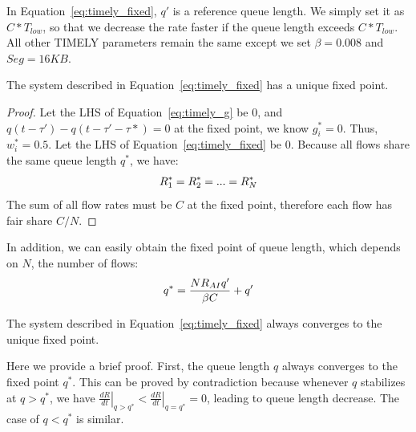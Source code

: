 In Equation~\ref{eq:timely_fixed}, $q'$ is a reference queue length. We simply set it as $C*T_{low}$, 
so that we decrease the rate faster if the queue length exceeds $C*T_{low}$. All
other TIMELY
parameters remain the same except we set $\beta=0.008$ and $Seg=16KB$. 
\begin{thm}
The system described in Equation~\ref{eq:timely_fixed} has a unique fixed point.
\end{thm}
\begin{proof}
Let the LHS of Equation~\ref{eq:timely_g} be 0, and $q(t - \tau ') - q(t - \tau ' - \tau *) = 0$ at the fixed 
point, we know $g_i^*=0$. Thus, $w_i^*=0.5$. Let the LHS of Equation~\ref{eq:timely_fixed} be 0. Because
all flows share the same queue length $q^*$, we have:
\begin{equation}
\small
R_1^* = R_2^* = ... = R_N^*
\end{equation}
The sum of all flow rates must be $C$ at the fixed point, therefore each flow has fair share $C/N$. 
\end{proof}
In addition, we can easily obtain the fixed point of queue length, which depends on $N$, the number of flows:
\begin{equation}
\small
{q^*} = \frac{{N{R_{AI}}q'}}{{\beta C}} + q'
\label{eq:timely_fixed_q}
\end{equation}
\begin{thm}
The system described in Equation~\ref{eq:timely_fixed} always converges to the unique fixed point.
\end{thm}
Here we provide a brief proof. First, the queue length $q$ always
converges to the fixed point $q^*$. This can be proved by contradiction because whenever $q$ stabilizes
at $q>q^*$, we have ${\left. {\frac{{dR}}{{dt}}} \right|_{q > {q^*}}} < {\left. {\frac{{dR}}{{dt}}} \right|_{q = {q^*}}} = 0$, 
leading to queue length decrease. The case of $q<q^*$ is similar. 

